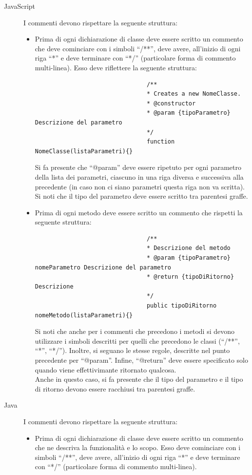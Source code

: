 			\begin{description}
					\item[JavaScript] I commenti devono rispettare la seguente struttura:
						\begin{itemize}
							\item Prima di ogni dichiarazione di classe deve essere scritto un commento che deve cominciare con i simboli “/**”, deve avere, all'inizio di ogni riga “*” e deve terminare con “*/” (particolare forma di commento multi-linea). Esso deve riflettere la seguente struttura:
							\begin{lstlisting} 
								/**
								* Creates a new NomeClasse. 
								* @constructor
								* @param {tipoParametro} Descrizione del parametro 
								*/
								function NomeClasse(listaParametri){}
							\end{lstlisting}
							Si fa presente che “@param” deve essere ripetuto per ogni parametro della lista dei parametri, ciascuno in una riga diversa e successiva alla precedente (in caso non ci siano parametri questa riga non va scritta).\\
							Si noti che il tipo del parametro deve essere scritto tra parentesi graffe.
							\item Prima di ogni metodo deve essere scritto un commento che rispetti la seguente struttura:
							\begin{lstlisting} 
								/**
								* Descrizione del metodo 
								* @param {tipoParametro} nomeParametro Descrizione del parametro
								* @return {tipoDiRitorno} Descrizione 
								*/
								public tipoDiRitorno nomeMetodo(listaParametri){}
							\end{lstlisting}
							Si noti che anche per i commenti che precedono i metodi si devono utilizzare i simboli descritti per quelli che precedono le classi (“/**”, “*”, “*/”). Inoltre, si seguano le stesse regole, descritte nel punto precedente per “@param”. Infine, “@return” deve essere specificato solo quando viene effettivimante ritornato qualcosa. \\
							Anche in questo caso, si fa presente che il tipo del parametro e il tipo di ritorno devono essere racchiusi tra parentesi graffe.
						\end{itemize}
					\item[Java] I commenti devono rispettare la seguente struttura:
						\begin{itemize}
							\item Prima di ogni dichiarazione di classe deve essere scritto un commento che ne descriva la funzionalità e lo scopo. Esso deve cominciare con i simboli “/**”, deve avere, all'inizio di ogni riga “*” e deve terminare con “*/” (particolare forma di commento multi-linea).

\end{itemize}
\end{description}
